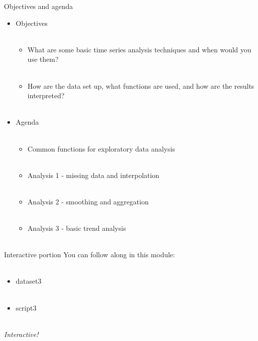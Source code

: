 \documentclass[xcolor=svgnames]{beamer}\usepackage[]{graphicx}\usepackage[]{color}
\begin{document}
\begin{frame}{Objectives and agenda}
\begin{itemize}
\onslide<+->
\item Objectives \\~\\
\begin{itemize}
\item What are some basic time series analysis techniques and when would you use them? \\~\\
\item How are the data set up, what functions are used, and how are the results interpreted? \\~\\
\end{itemize}
\onslide<+->
\item Agenda \\~\\
\begin{itemize}
\item Common functions for exploratory data analysis \\~\\
\item Analysis 1 - missing data and interpolation\\~\\
\item Analysis 2 - smoothing and aggregation \\~\\
\item Analysis 3 - basic trend analysis\\~\\
\end{itemize}
\end{itemize}
\end{frame}

\begin{frame}{Interactive portion}
You can follow along in this module: \\~\\
\begin{itemize}
\item dataset3 \\~\\
\item script3 \\~\\
\end{itemize}
\Large
\centerline{\emph{Interactive!}}
\end{frame}
\end{document}
